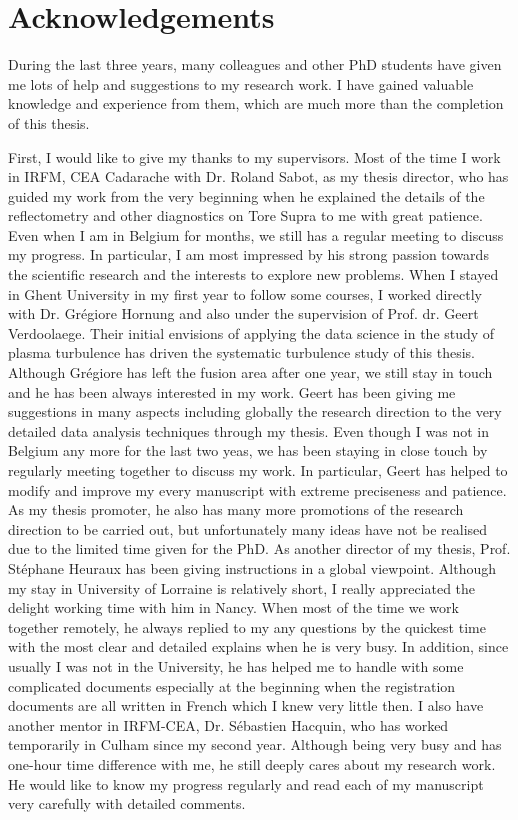 \chapter*{Acknowledgements}


During the last three years, many colleagues and other PhD students have given me lots of help and suggestions to my research work. I have gained valuable knowledge and experience from them, which are much more than the completion of this thesis.

First, I would like to give my thanks to my supervisors. Most of the time I work in IRFM, CEA Cadarache with Dr. Roland Sabot, as my thesis director, who has guided my work from the very beginning when he explained the details of the reflectometry and other diagnostics on Tore Supra to me with great patience. Even when I am in Belgium for months, we still has a regular meeting to discuss my progress. In particular, I am most impressed by his strong passion towards the scientific research and the interests to explore new problems. When I stayed in Ghent University in my first year to follow some courses, I worked directly with Dr. Gr\'{e}giore Hornung and also under the supervision of Prof. dr. Geert Verdoolaege. Their initial envisions of applying the data science in the study of plasma turbulence has driven the systematic turbulence study of this thesis. Although Gr\'{e}giore has left the fusion area after one year, we still stay in touch and he has been always interested in my work. Geert has been giving me suggestions in many aspects including globally the research direction to the very detailed data analysis techniques through my thesis. Even though I was not in Belgium any more for the last two yeas, we has been staying in close touch by regularly meeting together to discuss my work. In particular, Geert has helped to modify and improve my every manuscript with extreme preciseness and patience. As my thesis promoter, he also has many more promotions of the research direction to be carried out, but unfortunately many ideas have not be realised due to the limited time given for the PhD. As another director of my thesis, Prof. St\'{e}phane Heuraux has been giving instructions in a global viewpoint. Although my stay in University of Lorraine is relatively short, I really appreciated the delight working time with him in Nancy. When most of the time we work together remotely, he always replied to my any questions by the quickest time with the most clear and detailed explains when he is very busy. In addition, since usually I was not in the University, he has helped me to handle with some complicated documents especially at the beginning when the registration documents are all written in French which I knew very little then. I also have another mentor in IRFM-CEA, Dr. S\'{e}bastien Hacquin, who has worked temporarily in Culham since my second year. Although being very busy and has one-hour time difference with me, he still deeply cares about my research work. He would like to know my progress regularly and read each of my manuscript very carefully with detailed comments.



